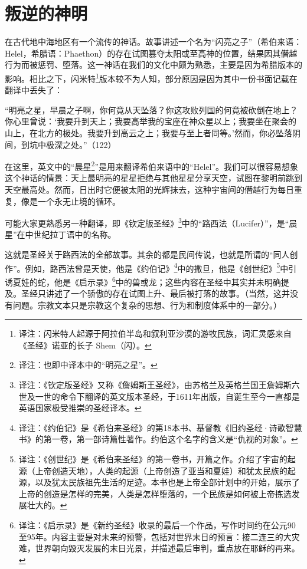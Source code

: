 \chapter{叛逆的神明}
在古代地中海地区有一个流传的神话。故事讲述一个名为“闪亮之子”（希伯来语：Helel，希腊语：Phaethon）的存在试图篡夺太阳或至高神的位置，结果因其僭越行为而被惩罚、堕落。这一神话在我们的文化中颇为熟悉，主要是因为希腊版本的影响。相比之下，闪米特\footnote{译注：闪米特人起源于阿拉伯半岛和叙利亚沙漠的游牧民族，词汇灵感来自《圣经》诺亚的长子 Shem（闪）。}版本较不为人知，部分原因是因为其中一份书面记载在翻译中丢失了：

“明亮之星，早晨之子啊，你何竟从天坠落？你这攻败列国的何竟被砍倒在地上？你心里曾说：‘我要升到天上；我要高举我的宝座在神众星以上；我要坐在聚会的山上，在北方的极处。我要升到高云之上；我要与至上者同等。’然而，你必坠落阴间，到坑中极深之处。”（122）

在这里，英文中的“晨星\footnote{译注：也即中译本中的“明亮之星”。}”是用来翻译希伯来语中的``Helel''。我们可以很容易想象这个神话的情景：天上最明亮的星星拒绝与其他星星分享天空，试图在黎明前跳到天空最高处。然而，日出时它便被太阳的光辉抹去，这种宇宙间的僭越行为每日重复，像是一个永无止境的循环。

可能大家更熟悉另一种翻译，即《钦定版圣经》\footnote{译注：《钦定版圣经》又称《詹姆斯王圣经》，由苏格兰及英格兰国王詹姆斯六世及一世的命令下翻译的英文版本圣经，于1611年出版，自诞生至今一直都是英语国家极受推崇的圣经译本。}中的“路西法（Lucifer）”，是“晨星”在中世纪拉丁语中的名称。

这就是圣经关于路西法的全部故事。其余的都是民间传说，也就是所谓的“同人创作”。例如，路西法曾是天使，他是《约伯记》\footnote{译注：《约伯记》是《希伯来圣经》的第18本书、基督教《旧约圣经·诗歌智慧书》的第一卷，第一部诗篇性著作。约伯这个名字的含义是“仇视的对象”。}中的撒旦，他是《创世纪》\footnote{译注：《创世纪》是《希伯来圣经》的第一卷书，开篇之作。介绍了宇宙的起源（上帝创造天地），人类的起源（上帝创造了亚当和夏娃）和犹太民族的起源，以及犹太民族祖先生活的足迹。本书也是上帝全部计划中的开始，展示了上帝的创造是怎样的完美，人类是怎样堕落的，一个民族是如何被上帝拣选发展壮大的。}中引诱夏娃的蛇，他是《启示录》\footnote{译注：《启示录》是《新约圣经》收录的最后一个作品，写作时间约在公元90至95年。内容主要是对未来的预警，包括对世界末日的预言：接二连三的大灾难，世界朝向毁灭发展的末日光景，并描述最后审判，重点放在耶稣的再来。}中的兽或龙；这些内容在圣经中其实并未明确提及。圣经只讲述了一个骄傲的存在试图上升、最后被打落的故事。（当然，这并没有问题。宗教文本只是宗教这个复杂的思想、行为和制度体系中的一部分。）

